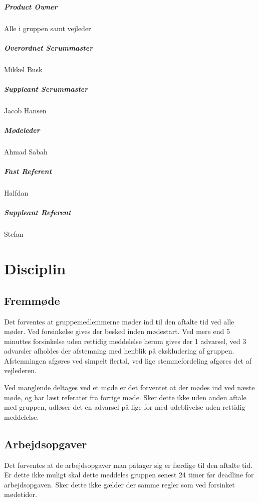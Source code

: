 \documentclass[a4paper,article,11pt,oneside]{memoir}
\begin{document}
\paragraph{Product Owner}
Alle i gruppen samt vejleder
\paragraph*{Overordnet Scrummaster} Mikkel Busk
\paragraph*{Suppleant Scrummaster} Jacob Hansen
\paragraph*{Mødeleder}
Ahmad Sabah
\paragraph*{Fast Referent}
Halfdan 
\paragraph*{Suppleant Referent}
Stefan
\chapter{Disciplin}
\section{Fremmøde}
Det forventes at gruppemedlemmerne møder ind til den aftalte tid ved alle møder.
Ved forsinkelse gives der besked inden mødestart.  Ved mere end  5 minuttes forsinkelse uden rettidig meddelelse herom gives der 1 advarsel, ved 3 advarsler afholdes der afstemning med henblik på ekskludering af gruppen. Afstemningen afgøres ved simpelt flertal, ved lige stemmefordeling afgøres det af vejlederen.

Ved manglende deltages ved et møde er det forventet at der mødes ind ved næste møde, og har læst referater fra forrige møde. Sker dette ikke uden anden aftale med gruppen, udløser det en advarsel på lige for med udeblivelse uden rettidig meddelelse.

\section{Arbejdsopgaver}
Det forventes at de arbejdsopgaver man påtager sig er færdige til den aftalte tid. Er dette ikke muligt skal dette meddeles gruppen senest 24 timer før deadline for arbejdsopgaven. Sker dette ikke gælder der samme regler som ved forsinket mødetider.



\end{document}
